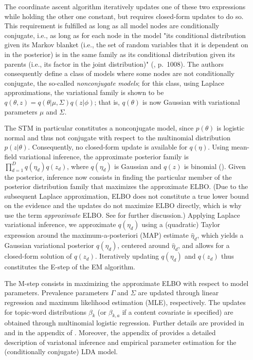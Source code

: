 The coordinate ascent algorithm iteratively updates one of these two expressions while holding the other one constant, but requires closed-form updates to do so. This requirement is fulfilled as long as all model nodes are conditionally conjugate, i.e., as long as for each node in the model "its conditional distribution given its Markov blanket (i.e., the set of random variables that it is dependent on in the posterior) is in the same family as its conditional distribution given its parents (i.e., its factor in the joint distribution)" (\cite{wang2013variational}, p.\ 1008). The authors consequently define a class of models where some nodes are not conditionally conjugate, the so-called \textit{nonconjugate models}; for this class, using Laplace approximations, the variational family is shown to be $q(\theta,z) = q(\theta|\mu,\Sigma)q(z|\phi)$; that is, $q(\theta)$ is now Gaussian with variational parameters $\mu$ and $\Sigma$.

The STM in particular constitutes a nonconjugate model, since $p(\theta)$ is logistic normal and thus not conjugate with respect to the multinomial distribution $p(z|\theta)$. Consequently, no closed-form update is available for $q(\eta)$. Using mean-field variational inference, the approximate posterior family is $\prod_{d=1}^{D}q(\eta_d)q(z_d)$, where $q(\eta_d)$ is Gaussian and $q(z)$ is binomial (\citealp{roberts2016model}). Given the posterior, inference now consists in finding the particular member of the posterior distribution family that maximizes the approximate ELBO. (Due to the subsequent Laplace approximation, ELBO does not constitute a true lower bound on the evidence and the updates do not maximize ELBO directly, which is why \cite{roberts2013structural} use the term \textit{approximate} ELBO. See \cite{wang2013variational} for further discussion.) Applying Laplace variational inference, we approximate $q(\eta_d)$ using a (quadratic) Taylor expression around the maximum-a-posteriori (MAP) estimate $\hat{\eta}_d$, which yields a Gaussian variational posterior $q(\eta_d)$, centered around $\hat{\eta}_d$, and allows for a closed-form solution of $q(z_d)$. Iteratively updating $q(\eta_d)$ and $q(z_d)$ thus constitutes the E-step of the EM algorithm.

The M-step consists in maximizing the approximate ELBO with respect to model parameters. Prevalence parameters $\Gamma$ and $\Sigma$ are updated through linear regression and maximum likelihood estimation (MLE), respectively. The updates for topic-word distributions $\beta_k$ (or $\beta_{k,a}$ if a content covariate is specified) are obtained through multinomial logistic regression. Further details are provided in \cite{roberts2013structural} and in the appendix of \cite{roberts2013structural}. Moreover, the appendix of \cite{blei2003latent} provides a detailed description of variatonal inference and empirical parameter estimation for the (conditionally conjugate) LDA model.
